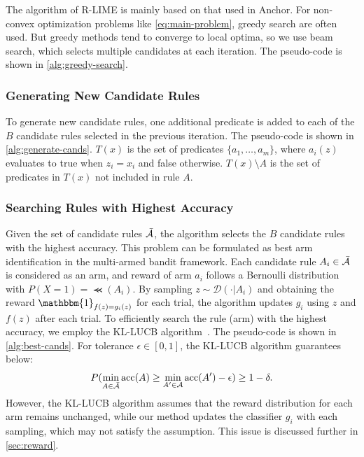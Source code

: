\documentclass[runningheads]{llncs}
\begin{document}
{{  \begin{algorithm}[p]
    \small
    
  \end{algorithm}
}
The algorithm of R-LIME
is mainly based on that used in Anchor\cite{ribeiro2018anchors}.
For non-convex optimization problems like \cref{eq:main-problem},
greedy search are often used.
But greedy methods tend to converge to local optima,
so we use beam search, which selects multiple candidates at each iteration.
The pseudo-code is shown in \cref{alg:greedy-search}.

\subsubsection{Generating New Candidate Rules}
To generate new candidate rules,
one additional predicate is added to each of the $B$ candidate rules
selected in the previous iteration.
The pseudo-code is shown in \cref{alg:generate-cands}.
$T(x)$ is the set of predicates $\{a_1,\dots,a_m\}$,
where $a_i(z)$ evaluates to true when $z_i=x_i$ and false otherwise.
$T(x)\setminus A$ is the set of predicates in $T(x)$ not included in rule $A$.

\subsubsection{Searching Rules with Highest Accuracy}
Given the set of candidate rules $\bar{\mathcal{A}}$,
the algorithm selects the $B$ candidate rules with the highest accuracy.
This problem can be formulated
as best arm identification in the multi-armed bandit framework.
Each candidate rule $A_i\in\bar{\mathcal{A}}$ is considered as an arm,
and reward of arm $a_i$ follows a Bernoulli distribution
with $P(X=1)=\Prec(A_i)$.
By sampling $z\sim\mathcal{D}(\cdot|A_i)$
and obtaining the reward $\mathbbm{1}_{f(z)=g_i(z)}$ for each trial,
the algorithm updates $g_i$ using $z$ and $f(z)$ after each trial.
To efficiently search the rule (arm) with the highest accuracy,
we employ the KL-LUCB algorithm~\cite{kaufmann2013information}.
The pseudo-code is shown in \cref{alg:best-cands}.
For tolerance $\epsilon\in[0,1]$, the KL-LUCB algorithm guarantees below:
\begin{equation}
  P(\underset{A\in\bar{\mathcal{A}}}{\min}\operatorname{acc}(A)\ge
  \underset{A'\in\mathcal{A}}{\min}\operatorname{acc}(A')-\epsilon)\ge1-\delta.
\end{equation}
However,
the KL-LUCB algorithm assumes that the reward distribution for each arm
remains unchanged,
while our method updates the classifier $g_i$ with each sampling,
which may not satisfy the assumption.
This issue is discussed further in \cref{sec:reward}.

}
\end{document}
